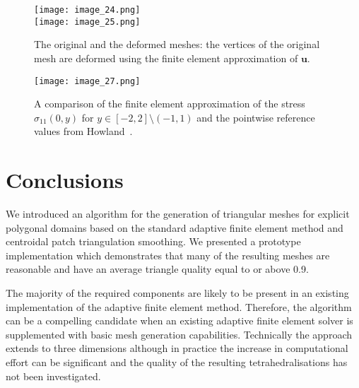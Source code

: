 \documentclass[11pt]{article}
\begin{document}
\begin{figure}
  \centering
  \texttt{[image: image\_24.png]}\\
  \texttt{[image: image\_25.png]}
  \caption{The original and the deformed meshes: the vertices of the original mesh are deformed using the
  finite element approximation of $\boldsymbol{u}$.}
  \label{fig:kirsch}
\end{figure}

\begin{figure}
  \centering
  \texttt{[image: image\_27.png]}
  \caption{A comparison of the finite element approximation of the stress $\sigma_{11}(0, y)$ for $y \in [-2, 2] \setminus (-1, 1)$
  and the pointwise reference values from Howland~\cite{howland1930stresses}.}
  \label{fig:kirsch2}
\end{figure}

\section{Conclusions}
\label{sec:org615e973}

We introduced an algorithm for the generation of triangular meshes for explicit
polygonal domains based on the standard adaptive finite element method and
centroidal patch triangulation smoothing.  We presented a prototype
implementation which demonstrates that many of the resulting
meshes are reasonable and have an average triangle quality equal to or above
0.9.

The majority of the required components are likely to be present in an
existing implementation of the adaptive finite element method.  Therefore, the algorithm
can be a compelling candidate when an existing adaptive finite element solver is
supplemented with basic mesh generation capabilities.
Technically the approach extends to three dimensions although in practice the
increase in computational effort can be significant and the quality of the
resulting tetrahedralisations has not been investigated.



\end{document}

